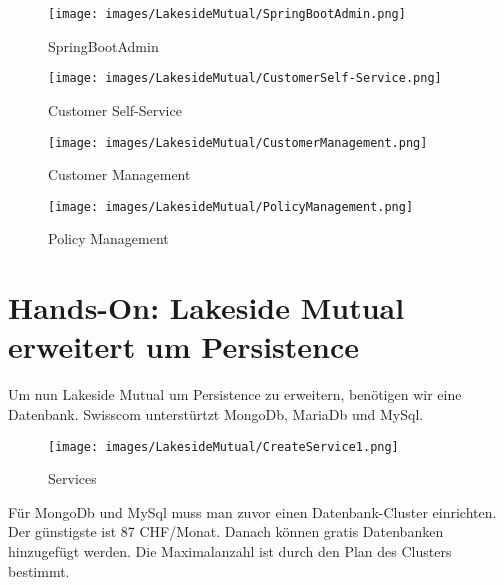 \documentclass[11pt,titlepage]{article}
\begin{document}
\begin{figure}[H]
  \begin{center}
    \texttt{[image: images/LakesideMutual/SpringBootAdmin.png]}
    \caption{SpringBootAdmin}
    \label{fig:cflsmSpringBootAdmin}
  \end{center}
\end{figure}

\begin{figure}[H]
  \begin{center}
    \texttt{[image: images/LakesideMutual/CustomerSelf-Service.png]}
    \caption{Customer Self-Service}
    \label{fig:cflsmCustomerSelfService}
  \end{center}
\end{figure}

\begin{figure}[H]
  \begin{center}
    \texttt{[image: images/LakesideMutual/CustomerManagement.png]}
    \caption{Customer Management}
    \label{fig:cflsmCustomerManagement}
  \end{center}
\end{figure}

\begin{figure}[H]
  \begin{center}
    \texttt{[image: images/LakesideMutual/PolicyManagement.png]}
    \caption{Policy Management}
    \label{fig:cflsmPolicyManagement}
  \end{center}
\end{figure}

\section{Hands-On: Lakeside Mutual erweitert um Persistence}
\label{sec:handsOnLakesideMutualPersistence}

Um nun Lakeside Mutual um Persistence zu erweitern, benötigen wir eine Datenbank. Swisscom unterstürtzt MongoDb, MariaDb und MySql.

\begin{figure}[H]
  \begin{center}
    \texttt{[image: images/LakesideMutual/CreateService1.png]}
    \caption{Services}
    \label{fig:cflsmCreateService1}
  \end{center}
\end{figure}

Für MongoDb und MySql muss man zuvor einen Datenbank-Cluster einrichten. Der günstigste ist 87 CHF/Monat. 
Danach können gratis Datenbanken hinzugefügt werden. Die Maximalanzahl ist durch den Plan des Clusters bestimmt.
\end{document}

